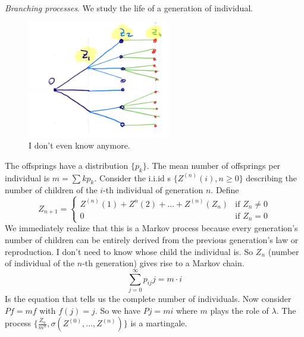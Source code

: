 \documentclass{report}
\begin{document}
\begin{example}
	\emph{Branching processes}. We study the life of a generation of individual. 
	\begin{figure}[H]
		\centering
		\includegraphics[width=0.5\linewidth]{screenshot015}
		\caption{I don't even know anymore.}
		\label{fig:screenshot015}
	\end{figure}
	The offsprings have a distribution $\{p_{k}\}$. The mean number of offsprings per individual is $m=\sum kp_{k}$. Consider the i.i.id \rv s $\{Z^{(n)}(i),n\geq 0\}$ describing the number of children of the $i$-th individual of generation $n$. Define 
\begin{equation*}
	Z_{n+1}=\begin{cases}
		Z^{(n)}(1)+Z^{n}(2)+\ldots+Z^{(n)}(Z_{n})&\text{if }Z_{n}\neq 0\\
		0&\text{if }Z_{n}=0
	\end{cases}
\end{equation*}
We immediately realize that this is a Markov process because every generation's number of children can be entirely derived from the previous generation's law or reproduction. I don't need to know whose child the individual is. So $Z_{n}$ (number of individual of the $n$-th generation) gives rise to a Markov chain. 
\begin{equation*}
	\sum_{j=0}^{\infty}p_{ij}j=m\cdot i
	\end{equation*}
	Is the equation that tells us the complete number of individuals. Now consider $Pf=mf$ with $f(j)=j$. So we have $Pj=mi$ where $m$ plays the role of $\lambda$. The process $\{\frac{Z_{n}}{m^{n}},\sigma(Z^{(0)},\ldots,Z^{(n)})\}$ is a martingale. 
\end{example}
\end{document}
